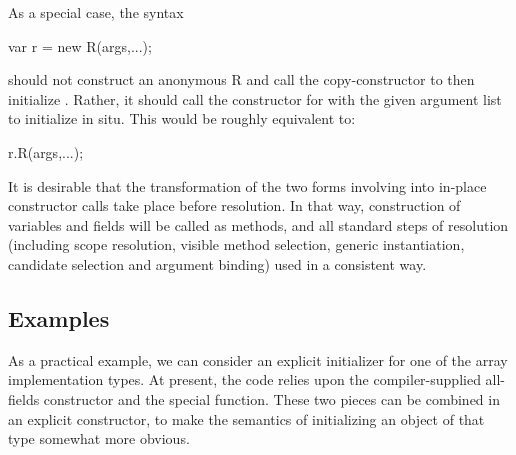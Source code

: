 As a special case, the syntax
\begin{chapel}
var r = new R(args,...);
\end{chapel}
\noindent
should not construct an anonymous R and call the copy-constructor to then initialize
.  Rather, it should call the constructor for  with the given argument
list to initialize  in situ.  This would be roughly equivalent to:
\begin{chapel}
r.R(args,...);
\end{chapel}

It is desirable that the transformation of the two forms involving \chpl{=} into in-place
constructor calls take place before resolution.  In that way, construction of variables
and fields will be called as methods, and all standard steps of resolution (including
scope resolution, visible method selection, generic instantiation, candidate selection and
argument binding) used in a consistent way.

\subsection{Examples}

As a practical example, we can consider an explicit initializer for one of the array
implementation types.  At present, the code relies upon the compiler-supplied all-fields
constructor and the special  function.  These two pieces can be combined in an
explicit constructor, to make the semantics of initializing an object of that type
somewhat more obvious.

